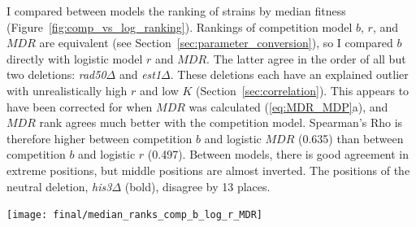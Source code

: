 \begin{multicols}{2}
I compared between models the ranking of strains by median fitness
(Figure~\ref{fig:comp_vs_log_ranking}). Rankings of competition model
\(b\), \(r\), and \(MDR\) are equivalent (see
Section~\ref{sec:parameter_conversion}), so I compared \(b\) directly
with logistic model \(r\) and \(MDR\).
The latter agree in the order of all but two deletions:
\textit{rad50\(\Delta\)} and \textit{est1\(\Delta\)}. These deletions
each have an explained outlier with unrealistically high \(r\) and low
\(K\) (Section~\ref{sec:correlation}). This appears to have been
corrected for when \(MDR\) was calculated (\ref{eq:MDR_MDP}a), and
\(MDR\) rank agrees much better with the competition model. Spearman's
Rho is therefore higher between competition \(b\) and logistic \(MDR\)
(0.635) than between competition \(b\) and logistic \(r\)
(0.497). Between models, there is good agreement in extreme positions,
but middle positions are almost inverted. The positions of the neutral
deletion, \textit{his3\(\Delta\)} (bold), disagree by 13 places.

\graphicspath{{images/rank/}}
\begin{Figure}
  \centering
  \texttt{[image: final/median\_ranks\_comp\_b\_log\_r\_MDR]}
  \label{fig:comp_vs_log_ranking}
\end{Figure}






\end{multicols}
